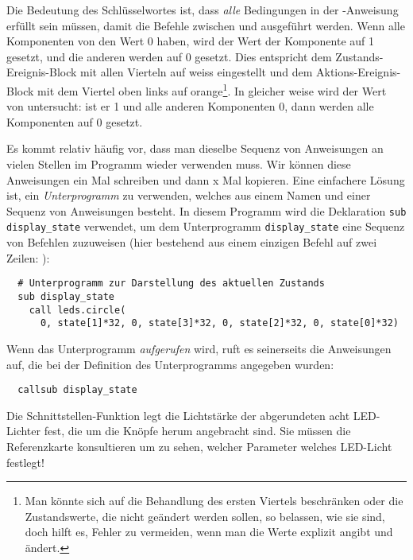 Die Bedeutung des Schlüsselwortes  ist, dass \emph{alle} Bedingungen in der -Anweisung erfüllt sein müssen, damit die Befehle zwischen  und  ausgeführt werden. Wenn alle Komponenten von  den Wert 0 haben, wird der Wert der Komponente  auf 1 gesetzt, und die anderen werden auf 0 gesetzt. Dies entspricht dem Zustands-Ereignis-Block mit allen Vierteln auf weiss eingestellt und dem Aktions-Ereignis-Block mit dem Viertel oben links auf orange\footnote{Man könnte sich auf die Behandlung des ersten Viertels beschränken oder die Zustandswerte, die nicht geändert werden sollen, so belassen, wie sie sind, doch hilft es, Fehler zu vermeiden, wenn man die Werte explizit angibt und ändert.}. 
In gleicher weise wird der Wert von  untersucht: ist er 1 und alle anderen Komponenten 0, dann werden alle Komponenten auf 0 gesetzt. 


Es kommt relativ häufig vor, dass man dieselbe Sequenz von Anweisungen an vielen Stellen im Programm wieder verwenden muss. Wir können diese Anweisungen ein Mal schreiben und dann x Mal kopieren. Eine einfachere Lösung ist, ein \emph{Unterprogramm} zu verwenden, welches aus einem Namen und einer Sequenz von Anweisungen besteht. In diesem Programm wird die Deklaration {\footnotesize\verb+sub display_state+} verwendet, um dem Unterprogramm {\footnotesize\verb+display_state+} eine Sequenz von Befehlen zuzuweisen (hier bestehend aus einem einzigen Befehl auf zwei Zeilen: ):

\begin{footnotesize}
\begin{verbatim}
  # Unterprogramm zur Darstellung des aktuellen Zustands
  sub display_state
    call leds.circle(
      0, state[1]*32, 0, state[3]*32, 0, state[2]*32, 0, state[0]*32)
\end{verbatim}
\end{footnotesize}

Wenn das Unterprogramm \emph{aufgerufen} wird, ruft es seinerseits die Anweisungen auf, die bei der Definition des Unterprogramms angegeben wurden: 
\vspace{-1ex}
\begin{footnotesize}
\begin{verbatim}
  callsub display_state
\end{verbatim}
\end{footnotesize}
\vspace{-1ex}
Die Schnittstellen-Funktion  legt die Lichtstärke der abgerundeten acht LED-Lichter fest, die um die Knöpfe herum angebracht sind. Sie müssen die Referenzkarte konsultieren um zu sehen, welcher Parameter welches LED-Licht festlegt!

